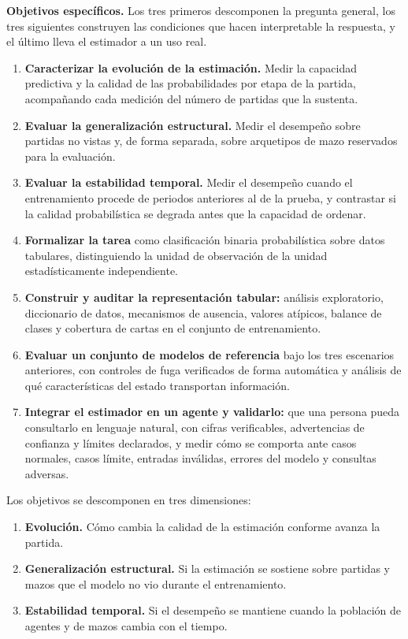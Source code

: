 \noindent\textbf{Objetivos específicos.} Los tres primeros descomponen la
pregunta general, los tres siguientes construyen las condiciones que hacen
interpretable la respuesta, y el último lleva el estimador a un uso real.

\begin{enumerate}
  \item \textbf{Caracterizar la evolución de la estimación.} Medir la
        capacidad predictiva y la calidad de las probabilidades por etapa de
        la partida, acompañando cada medición del número de partidas que la
        sustenta.
  \item \textbf{Evaluar la generalización estructural.} Medir el desempeño
        sobre partidas no vistas y, de forma separada, sobre arquetipos de
        mazo reservados para la evaluación.
  \item \textbf{Evaluar la estabilidad temporal.} Medir el desempeño cuando
        el entrenamiento procede de periodos anteriores al de la prueba, y
        contrastar si la calidad probabilística se degrada antes que la
        capacidad de ordenar.
  \item \textbf{Formalizar la tarea} como clasificación binaria
        probabilística sobre datos tabulares, distinguiendo la unidad de
        observación de la unidad estadísticamente independiente.
  \item \textbf{Construir y auditar la representación tabular:} análisis
        exploratorio, diccionario de datos, mecanismos de ausencia, valores
        atípicos, balance de clases y cobertura de cartas en el conjunto de
        entrenamiento.
  \item \textbf{Evaluar un conjunto de modelos de referencia} bajo los tres
        escenarios anteriores, con controles de fuga verificados de forma
        automática y análisis de qué características del estado transportan
        información.
  \item \textbf{Integrar el estimador en un agente y validarlo:} que una
        persona pueda consultarlo en lenguaje natural, con cifras
        verificables, advertencias de confianza y límites declarados, y
        medir cómo se comporta ante casos normales, casos límite, entradas
        inválidas, errores del modelo y consultas adversas.
\end{enumerate}

Los objetivos se descomponen en tres dimensiones:

\begin{enumerate}
  \item \textbf{Evolución.} Cómo cambia la calidad de la estimación conforme
        avanza la partida.
  \item \textbf{Generalización estructural.} Si la estimación se sostiene
        sobre partidas y mazos que el modelo no vio durante el
        entrenamiento.
  \item \textbf{Estabilidad temporal.} Si el desempeño se mantiene cuando la
        población de agentes y de mazos cambia con el tiempo.
\end{enumerate}

